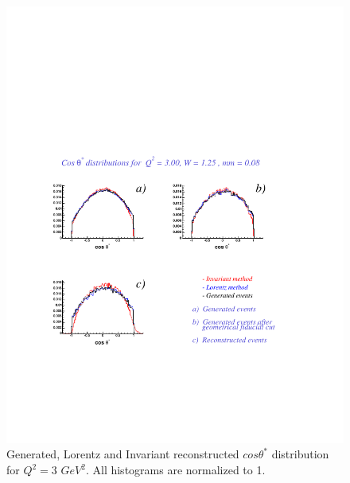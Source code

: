 \begin{figure}[h]
    \begin{center}
        \includegraphics[width = 12cm, bb = 60 140 540 540]{appendix/img/ctheta_q23.00_W1.25_mm0.08}
        \caption{Generated, Lorentz and Invariant reconstructed $cos\theta^*$ distribution for $Q^2=3$ $GeV^2$.
        All histograms are normalized to 1.}
    \end{center}
\end{figure}
